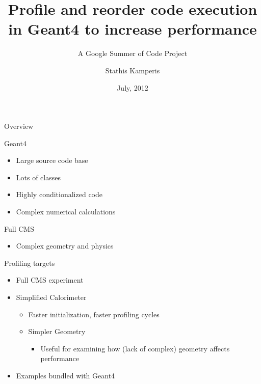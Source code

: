 \documentclass{beamer}
\begin{document}
\title{Profile and reorder code execution in Geant4 to increase performance}
\subtitle{A Google Summer of Code Project}
\author{Stathis Kamperis}
\date{July, 2012}

\begin{frame}[plain]
  \titlepage
\end{frame}


\begin{frame}{Overview}

Geant4
\begin{itemize}
  \item Large source code base
  \item Lots of classes
  \item Highly conditionalized code
  \item Complex numerical calculations
\end{itemize}

Full CMS
\begin{itemize}
\item Complex geometry and physics
\end{itemize}

\begin{center}
\end{center}
\end{frame}

\begin{frame}{Profiling targets}
\begin{itemize}
\item Full CMS experiment
\item Simplified Calorimeter
\begin{itemize}
\item Faster initialization, faster profiling cycles
\item Simpler Geometry
\begin{itemize}
\item Useful for examining how (lack of complex) geometry affects performance
\end{itemize}
\end{itemize}
\item Examples bundled with Geant4
\end{itemize}
\end{frame}
\end{document}
